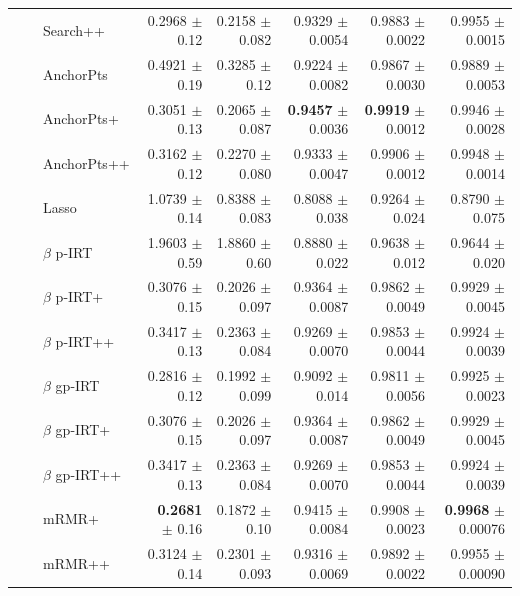 \begin{longtable}{llp{}rrrrr}
 &  & Search++ & 0.2968 {\scriptsize $\pm$ 0.12} & 0.2158 {\scriptsize $\pm$ 0.082} & 0.9329 {\scriptsize $\pm$ 0.0054} & 0.9883 {\scriptsize $\pm$ 0.0022} & 0.9955 {\scriptsize $\pm$ 0.0015} \\
 &  & AnchorPts & 0.4921 {\scriptsize $\pm$ 0.19} & 0.3285 {\scriptsize $\pm$ 0.12} & 0.9224 {\scriptsize $\pm$ 0.0082} & 0.9867 {\scriptsize $\pm$ 0.0030} & 0.9889 {\scriptsize $\pm$ 0.0053} \\
 &  & AnchorPts+ & 0.3051 {\scriptsize $\pm$ 0.13} & 0.2065 {\scriptsize $\pm$ 0.087} & \textbf{0.9457} {\scriptsize $\pm$ 0.0036} & \textbf{0.9919} {\scriptsize $\pm$ 0.0012} & 0.9946 {\scriptsize $\pm$ 0.0028} \\
 &  & AnchorPts++ & 0.3162 {\scriptsize $\pm$ 0.12} & 0.2270 {\scriptsize $\pm$ 0.080} & 0.9333 {\scriptsize $\pm$ 0.0047} & 0.9906 {\scriptsize $\pm$ 0.0012} & 0.9948 {\scriptsize $\pm$ 0.0014} \\
 &  & Lasso & 1.0739 {\scriptsize $\pm$ 0.14} & 0.8388 {\scriptsize $\pm$ 0.083} & 0.8088 {\scriptsize $\pm$ 0.038} & 0.9264 {\scriptsize $\pm$ 0.024} & 0.8790 {\scriptsize $\pm$ 0.075} \\
 &  & $\beta$ p-IRT & 1.9603 {\scriptsize $\pm$ 0.59} & 1.8860 {\scriptsize $\pm$ 0.60} & 0.8880 {\scriptsize $\pm$ 0.022} & 0.9638 {\scriptsize $\pm$ 0.012} & 0.9644 {\scriptsize $\pm$ 0.020} \\
 &  & $\beta$ p-IRT+ & 0.3076 {\scriptsize $\pm$ 0.15} & 0.2026 {\scriptsize $\pm$ 0.097} & 0.9364 {\scriptsize $\pm$ 0.0087} & 0.9862 {\scriptsize $\pm$ 0.0049} & 0.9929 {\scriptsize $\pm$ 0.0045} \\
 &  & $\beta$ p-IRT++ & 0.3417 {\scriptsize $\pm$ 0.13} & 0.2363 {\scriptsize $\pm$ 0.084} & 0.9269 {\scriptsize $\pm$ 0.0070} & 0.9853 {\scriptsize $\pm$ 0.0044} & 0.9924 {\scriptsize $\pm$ 0.0039} \\
 &  & $\beta$ gp-IRT & 0.2816 {\scriptsize $\pm$ 0.12} & 0.1992 {\scriptsize $\pm$ 0.099} & 0.9092 {\scriptsize $\pm$ 0.014} & 0.9811 {\scriptsize $\pm$ 0.0056} & 0.9925 {\scriptsize $\pm$ 0.0023} \\
 &  & $\beta$ gp-IRT+ & 0.3076 {\scriptsize $\pm$ 0.15} & 0.2026 {\scriptsize $\pm$ 0.097} & 0.9364 {\scriptsize $\pm$ 0.0087} & 0.9862 {\scriptsize $\pm$ 0.0049} & 0.9929 {\scriptsize $\pm$ 0.0045} \\
 &  & $\beta$ gp-IRT++ & 0.3417 {\scriptsize $\pm$ 0.13} & 0.2363 {\scriptsize $\pm$ 0.084} & 0.9269 {\scriptsize $\pm$ 0.0070} & 0.9853 {\scriptsize $\pm$ 0.0044} & 0.9924 {\scriptsize $\pm$ 0.0039} \\
 &  & mRMR+ & \textbf{0.2681} {\scriptsize $\pm$ 0.16} & 0.1872 {\scriptsize $\pm$ 0.10} & 0.9415 {\scriptsize $\pm$ 0.0084} & 0.9908 {\scriptsize $\pm$ 0.0023} & \textbf{0.9968} {\scriptsize $\pm$ 0.00076} \\
 &  & mRMR++ & 0.3124 {\scriptsize $\pm$ 0.14} & 0.2301 {\scriptsize $\pm$ 0.093} & 0.9316 {\scriptsize $\pm$ 0.0069} & 0.9892 {\scriptsize $\pm$ 0.0022} & 0.9955 {\scriptsize $\pm$ 0.00090} \\
\end{longtable}
